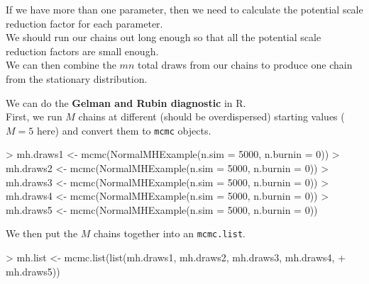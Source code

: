 \documentclass{beamer}
\begin{document}
\begin{frame}
If we have more than one parameter, then we need to calculate the
potential scale reduction factor for each parameter.\\
\bigskip
\pause
We should run our chains out long enough so that all the potential
scale reduction factors are small enough.\\
\bigskip
\pause
We can then combine the $mn$ total draws from our chains to produce
one chain from the stationary distribution.
\end{frame}


\begin{frame}[fragile]
We can do the \textbf{Gelman and Rubin diagnostic} in R.\\
\bigskip
\pause
First, we run $M$ chains at different (should be overdispersed)
starting values ($M = 5$ here) and convert them to {\tt mcmc} objects.
\pause
\medskip
\tiny
\begin{Schunk}
\begin{Sinput}
> mh.draws1 <- mcmc(NormalMHExample(n.sim = 5000, n.burnin = 0))
> mh.draws2 <- mcmc(NormalMHExample(n.sim = 5000, n.burnin = 0))
> mh.draws3 <- mcmc(NormalMHExample(n.sim = 5000, n.burnin = 0))
> mh.draws4 <- mcmc(NormalMHExample(n.sim = 5000, n.burnin = 0))
> mh.draws5 <- mcmc(NormalMHExample(n.sim = 5000, n.burnin = 0))
\end{Sinput}
\end{Schunk}
\normalsize
\bigskip
\pause
We then put the $M$ chains together into an {\tt mcmc.list}.
\pause
\medskip
\tiny
\begin{Schunk}
\begin{Sinput}
> mh.list <- mcmc.list(list(mh.draws1, mh.draws2, mh.draws3, mh.draws4, 
+     mh.draws5))
\end{Sinput}
\end{Schunk}
\normalsize
\end{frame}
\end{document}
